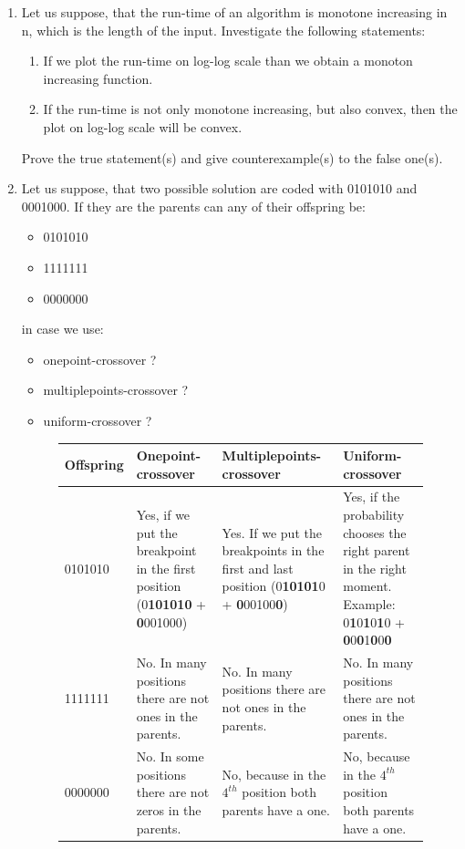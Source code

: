 \documentclass[12pt,english]{article}
\begin{document}
\begin{enumerate}
	\item Let us suppose, that the run-time of an algorithm is monotone increasing in n, which is the length of the input. Investigate the following statements:
	\begin{enumerate}
		\item If we plot the run-time on log-log scale than we obtain a monoton increasing function.
		\item If the run-time is not only monotone increasing, but also convex, then the plot on log-log scale will be convex.
	\end{enumerate}
	Prove the true statement(s) and give counterexample(s) to the false one(s).
	\item Let us suppose, that two possible solution are coded with 0101010 and 0001000. If they are the parents can any of their offspring be:
	\begin{itemize}
		\item 0101010
		\item 1111111
		\item 0000000
	\end{itemize}
in case we use:
\begin{itemize}
	\item onepoint-crossover ?
	\item multiplepoints-crossover ?
	\item uniform-crossover ?
\end{itemize}

\begin{figure}[H]
\centering
	\begin{tabular}{|m{3cm}|m{4cm}|m{4cm}|m{4cm}|}
	\hline
		\textbf{Offspring} & \textbf{Onepoint-crossover} & \textbf{Multiplepoints-crossover} & \textbf{Uniform-crossover}\\
		\hline
		 0101010 & Yes, if we put the breakpoint in the first position (0\textbf{101010} + \textbf{0}001000)& Yes. If we put the breakpoints in the first and last position (0\textbf{10101}0 + \textbf{0}00100\textbf{0}) & Yes, if the probability chooses the right parent in the right moment. Example: 0\textbf{1}0\textbf{1}0\textbf{1}0 + \textbf{0}0\textbf{0}1\textbf{0}0\textbf{0} \\
		 \hline
		 1111111 & No. In many positions there are not ones in the parents.& No. In many positions there are not ones in the parents.& No. In many positions there are not ones in the parents.\\
		 \hline
		 0000000 & No. In some positions there are not zeros in the parents. & No, because in the $4^{th}$ position both parents have a one.& No, because in the $4^{th}$ position both parents have a one.\\
		 \hline
	\end{tabular}
\end{figure}


\end{enumerate}
\end{document}
